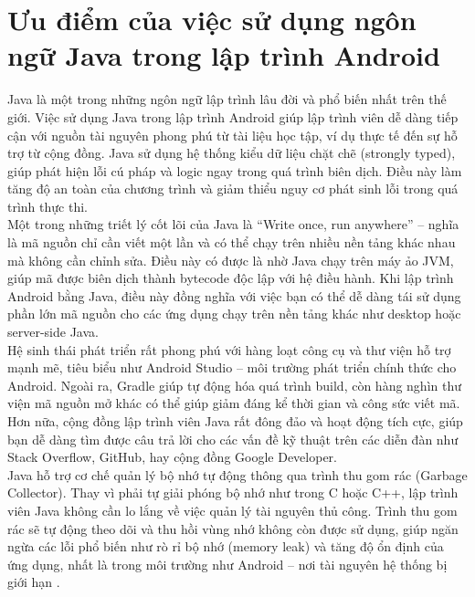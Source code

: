 \section{ Ưu điểm của việc sử dụng ngôn ngữ Java trong lập trình Android}
        \hspace*{0.8cm}Java là một trong những ngôn ngữ lập trình lâu đời và phổ biến nhất trên thế giới. Việc sử dụng Java trong lập trình Android giúp lập trình viên dễ dàng tiếp cận với nguồn tài nguyên phong phú từ tài liệu học tập, ví dụ thực tế đến sự hỗ trợ từ cộng đồng. Java sử dụng hệ thống kiểu dữ liệu chặt chẽ (strongly typed), giúp phát hiện lỗi cú pháp và logic ngay trong quá trình biên dịch. Điều này làm tăng độ an toàn của chương trình và giảm thiểu nguy cơ phát sinh lỗi trong quá trình thực thi.\\
        \hspace*{0.8cm}Một trong những triết lý cốt lõi của Java là “Write once, run anywhere” – nghĩa là mã nguồn chỉ cần viết một lần và có thể chạy trên nhiều nền tảng khác nhau mà không cần chỉnh sửa. Điều này có được là nhờ Java chạy trên máy ảo JVM, giúp mã được biên dịch thành bytecode độc lập với hệ điều hành. Khi lập trình Android bằng Java, điều này đồng nghĩa với việc bạn có thể dễ dàng tái sử dụng phần lớn mã nguồn cho các ứng dụng chạy trên nền tảng khác như desktop hoặc server-side Java.\\
        \hspace*{0.8cm}Hệ sinh thái phát triển rất phong phú với hàng loạt công cụ và thư viện hỗ trợ mạnh mẽ, tiêu biểu như Android Studio – môi trường phát triển chính thức cho Android. Ngoài ra, Gradle giúp tự động hóa quá trình build, còn hàng nghìn thư viện mã nguồn mở khác có thể giúp giảm đáng kể thời gian và công sức viết mã. Hơn nữa, cộng đồng lập trình viên Java rất đông đảo và hoạt động tích cực, giúp bạn dễ dàng tìm được câu trả lời cho các vấn đề kỹ thuật trên các diễn đàn như Stack Overflow, GitHub, hay cộng đồng Google Developer.\\
        \hspace*{0.8cm}Java hỗ trợ cơ chế quản lý bộ nhớ tự động thông qua trình thu gom rác (Garbage Collector). Thay vì phải tự giải phóng bộ nhớ như trong C hoặc C++, lập trình viên Java không cần lo lắng về việc quản lý tài nguyên thủ công. Trình thu gom rác sẽ tự động theo dõi và thu hồi vùng nhớ không còn được sử dụng, giúp ngăn ngừa các lỗi phổ biến như rò rỉ bộ nhớ (memory leak) và tăng độ ổn định của ứng dụng, nhất là trong môi trường như Android – nơi tài nguyên hệ thống bị giới hạn \cite{java-tutorial}.\\
    

